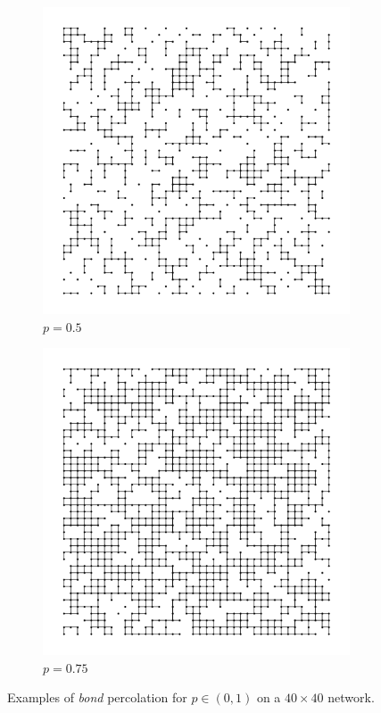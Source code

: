 \begin{figure}[p]
\begin{subfigure}[b]{0.45\textwidth}
    \includegraphics[width=\textwidth]{1/percolation2}
    \caption{$p=0.5$}
    \label{fig:p=0.5}
  \end{subfigure}
  \hfill
  \begin{subfigure}[b]{0.45\textwidth}
    \centering
    \includegraphics[width=\textwidth]{1/percolation3}
    \caption{$p=0.75$}
    \label{fig:p=0.75}
  \end{subfigure}
  \caption{Examples of \textit{bond} percolation for $p\in(0,1)$ on a $40 \times 40$ network.}
  \label{fig:probabilities}
\end{figure}

